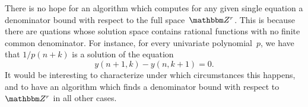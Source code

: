 \documentclass[a4paper]{sig-alternate}
\let\set\mathbbm
\begin{document}
There is no hope for an algorithm which computes for any given single equation a
denominator bound with respect to the full space~$\set Z^r$. This is because
there are quations whose solution space contains rational functions with no
finite common denominator. For instance, for every univariate polynomial~$p$, we
have that $1/p(n+k)$ is a solution of the equation
\[
  y(n+1,k)-y(n,k+1)=0.
\]
It would be interesting to characterize under which circumstances this happens,
and to have an algorithm which finds a denominator bound with respect to $\set Z^r$
in all other cases. 



\end{document}

